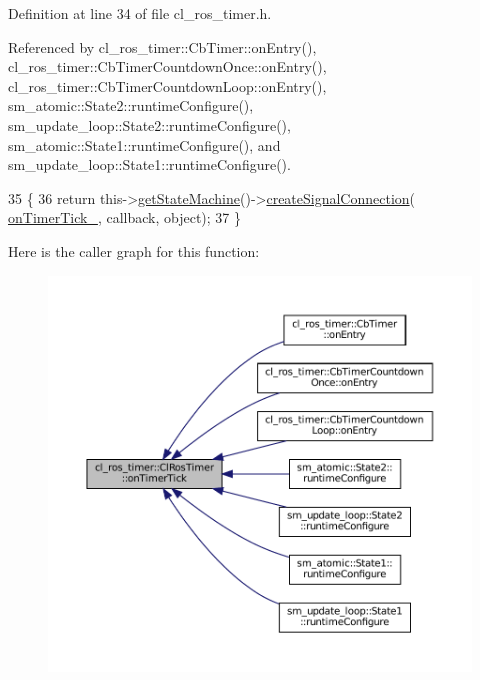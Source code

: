 Definition at line 34 of file cl\+\_\+ros\+\_\+timer.\+h.



Referenced by cl\+\_\+ros\+\_\+timer\+::\+Cb\+Timer\+::on\+Entry(), cl\+\_\+ros\+\_\+timer\+::\+Cb\+Timer\+Countdown\+Once\+::on\+Entry(), cl\+\_\+ros\+\_\+timer\+::\+Cb\+Timer\+Countdown\+Loop\+::on\+Entry(), sm\+\_\+atomic\+::\+State2\+::runtime\+Configure(), sm\+\_\+update\+\_\+loop\+::\+State2\+::runtime\+Configure(), sm\+\_\+atomic\+::\+State1\+::runtime\+Configure(), and sm\+\_\+update\+\_\+loop\+::\+State1\+::runtime\+Configure().


\begin{DoxyCode}
35     \{
36         \textcolor{keywordflow}{return} this->\hyperlink{classsmacc_1_1ISmaccClient_aec51d4712404cb9882b86e4c854bb93a}{getStateMachine}()->\hyperlink{classsmacc_1_1ISmaccStateMachine_adf0f42ade0c65cc471960fe2a7c42da2}{createSignalConnection}(
      \hyperlink{classcl__ros__timer_1_1ClRosTimer_a2fcaab287b6ee13f6cc689876c6d28fa}{onTimerTick\_}, callback, \textcolor{keywordtype}{object});
37     \}
\end{DoxyCode}
Here is the caller graph for this function\+:
\nopagebreak
\begin{figure}[H]
\begin{center}
\leavevmode
\includegraphics[width=350pt]{classcl__ros__timer_1_1ClRosTimer_a7edcc057bfb5a25fe0892755137dd8da_icgraph}
\end{center}
\end{figure}
\mbox{\label{classcl__ros__timer_1_1ClRosTimer_a047720c2f37e354e0867b148c85e18e3}} 
